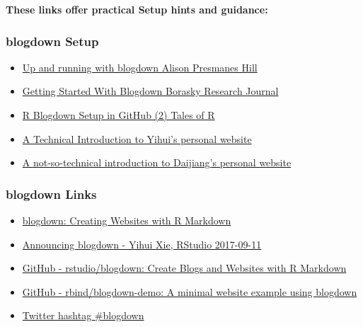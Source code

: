 \documentclass[]{book}
\providecommand{\tightlist}{%
  \setlength{\itemsep}{0pt}\setlength{\parskip}{0pt}}
\theoremstyle{definition}
\theoremstyle{definition}
\theoremstyle{definition}
\theoremstyle{remark}
\begin{document}
\textbf{These links offer practical Setup hints and guidance:}

\hypertarget{blogdown-setup}{%
\subsubsection{blogdown Setup}\label{blogdown-setup}}

\begin{itemize}
\tightlist
\item
  \href{https://alison.rbind.io/post/up-and-running-with-blogdown/}{Up
  and running with blogdown \textbar{} Alison Presmanes Hill}
\item
  \href{https://www.znmeb.mobi/2017/05/12/getting-started-with-blogdown/}{Getting
  Started With Blogdown \textbar{} Borasky Research Journal}
\item
  \href{https://aurora-mareviv.github.io/talesofr/2018/02/r-blogdown-setup-in-github-2/}{R
  Blogdown Setup in GitHub (2) \textbar{} Tales of R}
\item
  \href{https://support.rbind.io/2017/04/25/yihui-website/\#fnref:For-two-reasons}{A
  Technical Introduction to Yihui's personal website}
\item
  \href{https://support.rbind.io/2017/04/28/daijiang-website/\#fnref:frankly-I-cloned}{A
  not-so-technical introduction to Daijiang's personal website}
\end{itemize}

\hypertarget{blogdown-links}{%
\subsubsection{blogdown Links}\label{blogdown-links}}

\begin{itemize}
\tightlist
\item
  \href{https://bookdown.org/yihui/blogdown/}{blogdown: Creating
  Websites with R Markdown}
\item
  \href{https://blog.rstudio.com/2017/09/11/announcing-blogdown/}{Announcing
  blogdown - Yihui Xie, RStudio 2017-09-11}
\item
  \href{https://github.com/rstudio/blogdown}{GitHub - rstudio/blogdown:
  Create Blogs and Websites with R Markdown}
\item
  \href{https://github.com/rbind/blogdown-demo}{GitHub -
  rbind/blogdown-demo: A minimal website example using blogdown}
\item
  \href{https://twitter.com/hashtag/blogdown}{Twitter hashtag
  \#blogdown}
\end{itemize}
\end{document}
